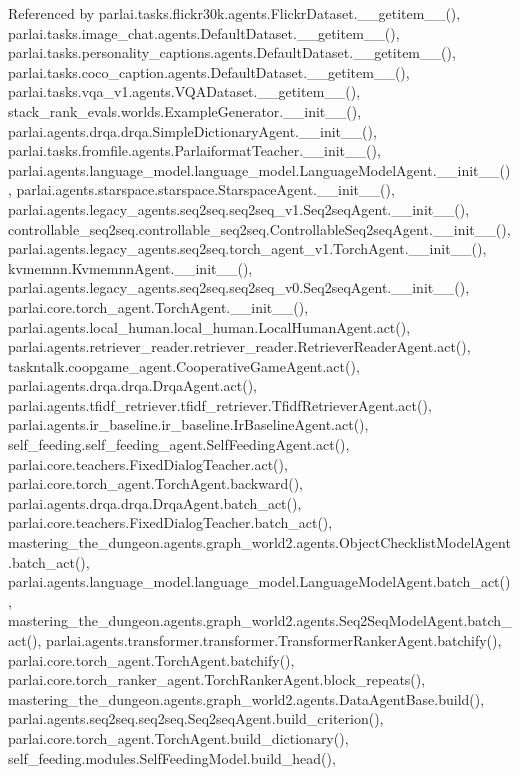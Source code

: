 Referenced by parlai.\+tasks.\+flickr30k.\+agents.\+Flickr\+Dataset.\+\_\+\+\_\+getitem\+\_\+\+\_\+(), parlai.\+tasks.\+image\+\_\+chat.\+agents.\+Default\+Dataset.\+\_\+\+\_\+getitem\+\_\+\+\_\+(), parlai.\+tasks.\+personality\+\_\+captions.\+agents.\+Default\+Dataset.\+\_\+\+\_\+getitem\+\_\+\+\_\+(), parlai.\+tasks.\+coco\+\_\+caption.\+agents.\+Default\+Dataset.\+\_\+\+\_\+getitem\+\_\+\+\_\+(), parlai.\+tasks.\+vqa\+\_\+v1.\+agents.\+V\+Q\+A\+Dataset.\+\_\+\+\_\+getitem\+\_\+\+\_\+(), stack\+\_\+rank\+\_\+evals.\+worlds.\+Example\+Generator.\+\_\+\+\_\+init\+\_\+\+\_\+(), parlai.\+agents.\+drqa.\+drqa.\+Simple\+Dictionary\+Agent.\+\_\+\+\_\+init\+\_\+\+\_\+(), parlai.\+tasks.\+fromfile.\+agents.\+Parlaiformat\+Teacher.\+\_\+\+\_\+init\+\_\+\+\_\+(), parlai.\+agents.\+language\+\_\+model.\+language\+\_\+model.\+Language\+Model\+Agent.\+\_\+\+\_\+init\+\_\+\+\_\+(), parlai.\+agents.\+starspace.\+starspace.\+Starspace\+Agent.\+\_\+\+\_\+init\+\_\+\+\_\+(), parlai.\+agents.\+legacy\+\_\+agents.\+seq2seq.\+seq2seq\+\_\+v1.\+Seq2seq\+Agent.\+\_\+\+\_\+init\+\_\+\+\_\+(), controllable\+\_\+seq2seq.\+controllable\+\_\+seq2seq.\+Controllable\+Seq2seq\+Agent.\+\_\+\+\_\+init\+\_\+\+\_\+(), parlai.\+agents.\+legacy\+\_\+agents.\+seq2seq.\+torch\+\_\+agent\+\_\+v1.\+Torch\+Agent.\+\_\+\+\_\+init\+\_\+\+\_\+(), kvmemnn.\+Kvmemnn\+Agent.\+\_\+\+\_\+init\+\_\+\+\_\+(), parlai.\+agents.\+legacy\+\_\+agents.\+seq2seq.\+seq2seq\+\_\+v0.\+Seq2seq\+Agent.\+\_\+\+\_\+init\+\_\+\+\_\+(), parlai.\+core.\+torch\+\_\+agent.\+Torch\+Agent.\+\_\+\+\_\+init\+\_\+\+\_\+(), parlai.\+agents.\+local\+\_\+human.\+local\+\_\+human.\+Local\+Human\+Agent.\+act(), parlai.\+agents.\+retriever\+\_\+reader.\+retriever\+\_\+reader.\+Retriever\+Reader\+Agent.\+act(), taskntalk.\+coopgame\+\_\+agent.\+Cooperative\+Game\+Agent.\+act(), parlai.\+agents.\+drqa.\+drqa.\+Drqa\+Agent.\+act(), parlai.\+agents.\+tfidf\+\_\+retriever.\+tfidf\+\_\+retriever.\+Tfidf\+Retriever\+Agent.\+act(), parlai.\+agents.\+ir\+\_\+baseline.\+ir\+\_\+baseline.\+Ir\+Baseline\+Agent.\+act(), self\+\_\+feeding.\+self\+\_\+feeding\+\_\+agent.\+Self\+Feeding\+Agent.\+act(), parlai.\+core.\+teachers.\+Fixed\+Dialog\+Teacher.\+act(), parlai.\+core.\+torch\+\_\+agent.\+Torch\+Agent.\+backward(), parlai.\+agents.\+drqa.\+drqa.\+Drqa\+Agent.\+batch\+\_\+act(), parlai.\+core.\+teachers.\+Fixed\+Dialog\+Teacher.\+batch\+\_\+act(), mastering\+\_\+the\+\_\+dungeon.\+agents.\+graph\+\_\+world2.\+agents.\+Object\+Checklist\+Model\+Agent.\+batch\+\_\+act(), parlai.\+agents.\+language\+\_\+model.\+language\+\_\+model.\+Language\+Model\+Agent.\+batch\+\_\+act(), mastering\+\_\+the\+\_\+dungeon.\+agents.\+graph\+\_\+world2.\+agents.\+Seq2\+Seq\+Model\+Agent.\+batch\+\_\+act(), parlai.\+agents.\+transformer.\+transformer.\+Transformer\+Ranker\+Agent.\+batchify(), parlai.\+core.\+torch\+\_\+agent.\+Torch\+Agent.\+batchify(), parlai.\+core.\+torch\+\_\+ranker\+\_\+agent.\+Torch\+Ranker\+Agent.\+block\+\_\+repeats(), mastering\+\_\+the\+\_\+dungeon.\+agents.\+graph\+\_\+world2.\+agents.\+Data\+Agent\+Base.\+build(), parlai.\+agents.\+seq2seq.\+seq2seq.\+Seq2seq\+Agent.\+build\+\_\+criterion(), parlai.\+core.\+torch\+\_\+agent.\+Torch\+Agent.\+build\+\_\+dictionary(), self\+\_\+feeding.\+modules.\+Self\+Feeding\+Model.\+build\+\_\+head(), 
